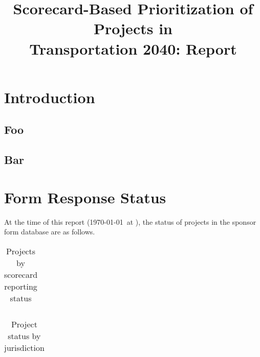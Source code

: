 \documentclass[10pt, letterpaper, final, twoside, onecolumn]{memoir}%
\title{Scorecard-Based Prioritization of Projects in \\Transportation 2040: Report}
\author{}
\begin{document}
\maketitle

\tableofcontents %

\chapter{Introduction}
\lipsum[1]

\section{Foo}
\lipsum[2]

\section{Bar}
\lipsum[3-4]

\chapter{Form Response Status}
At the time of this report (\today \ at \currenttime), the status of projects in the sponsor form database are as follows.


\begin{table}[htdp]
\caption{Projects by scorecard reporting status}
\begin{center}
\begin{tabularx}{0.35\textwidth}{>{\raggedright\arraybackslash}X>{\raggedright\arraybackslash}X}
\toprule



\end{tabularx}
\end{center}
\label{tb:projects_by_status}
\end{table}%


\begin{table}[htdp]
\scriptsize %
\caption{Project status by jurisdiction}
\begin{center}
\begin{tabularx}{0.5\textwidth}{>{\raggedright\arraybackslash}p{8pc}>{\raggedright\arraybackslash}X>{\raggedright\arraybackslash}X>{\raggedright\arraybackslash}X}
\toprule



\end{tabularx}
\end{center}
\label{tb:projects_by_jurisdiction}
\end{table}%
\end{document}
